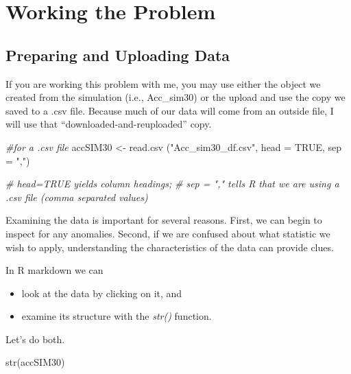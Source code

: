 \documentclass[
  english,
]{book}
\newenvironment{Shaded}{\begin{snugshade}}{\end{snugshade}}
\newcommand{\AttributeTok}[1]{\textcolor[rgb]{0.77,0.63,0.00}{#1}}
\newcommand{\CommentTok}[1]{\textcolor[rgb]{0.56,0.35,0.01}{\textit{#1}}}
\newcommand{\ConstantTok}[1]{\textcolor[rgb]{0.00,0.00,0.00}{#1}}
\newcommand{\FunctionTok}[1]{\textcolor[rgb]{0.00,0.00,0.00}{#1}}
\newcommand{\NormalTok}[1]{#1}
\newcommand{\OtherTok}[1]{\textcolor[rgb]{0.56,0.35,0.01}{#1}}
\newcommand{\StringTok}[1]{\textcolor[rgb]{0.31,0.60,0.02}{#1}}
\providecommand{\tightlist}{%
  \setlength{\itemsep}{0pt}\setlength{\parskip}{0pt}}
\begin{document}
\hypertarget{working-the-problem}{%
\section{Working the Problem}\label{working-the-problem}}

\hypertarget{preparing-and-uploading-data}{%
\subsection{Preparing and Uploading Data}\label{preparing-and-uploading-data}}

If you are working this problem with me, you may use either the object we created from the simulation (i.e., Acc\_sim30) or the upload and use the copy we saved to a .csv file. Because much of our data will come from an outside file, I will use that ``downloaded-and-reuploaded'' copy.

\begin{Shaded}
\begin{Highlighting}[]
\CommentTok{\#for a .csv file}
\NormalTok{accSIM30 }\OtherTok{\textless{}{-}} \FunctionTok{read.csv}\NormalTok{ (}\StringTok{"Acc\_sim30\_df.csv"}\NormalTok{, }\AttributeTok{head =} \ConstantTok{TRUE}\NormalTok{, }\AttributeTok{sep =} \StringTok{","}\NormalTok{)}

\CommentTok{\# head=TRUE yields column headings;}
\CommentTok{\# sep = "," tells R that we are using a .csv file (comma separated values)}
\end{Highlighting}
\end{Shaded}

Examining the data is important for several reasons. First, we can begin to inspect for any anomalies. Second, if we are confused about what statistic we wish to apply, understanding the characteristics of the data can provide clues.

In R markdown we can

\begin{itemize}
\tightlist
\item
  look at the data by clicking on it, and
\item
  examine its structure with the \emph{str()} function.
\end{itemize}

Let's do both.

\begin{Shaded}
\begin{Highlighting}[]
\FunctionTok{str}\NormalTok{(accSIM30)}
\end{Highlighting}
\end{Shaded}
\end{document}
